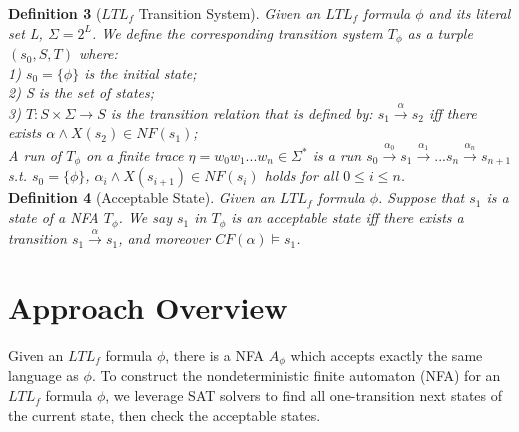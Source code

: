 {\bf Definition 3} ($LTL_f$ Transition System). {\it Given an $LTL_f$ formula $\phi$ and its literal set L, $\Sigma = 2^{L}$. We define the corresponding transition system $T_{\phi}$ as a turple $(s_0,S, T)$ where: \\
1) $s_0 = \{\phi\}$ is the initial state; \\
2) S is the set of states;\\
3) $T : S \times \Sigma \to S$ is the transition relation that is defined by: $s_1\overset{\alpha}{\rightarrow} s_2$ iff there exists $\alpha \wedge X(s_2) \in NF(s_1)$; \\
A run of $T_{\phi}$ on a finite trace $\eta = w_0w_1...w_n \in \Sigma^{*}$ is a run $s_0 \overset{\alpha_0}{\rightarrow} s_1 \overset{\alpha_1}{\rightarrow} ... s_n \overset{\alpha_n}{\rightarrow} s_{n+1} $ s.t. $s_0 = \{\phi\}$,  $\alpha_i \wedge X(s_{i+1}) \in NF(s_i)$ holds for all $0 \leq i \leq n$.
\\}
{\bf Definition 4} (Acceptable State). {\it Given an $LTL_f$ formula $\phi$. Suppose that $s_1$ is a state of a NFA $T_{\phi}$. We say  $s_1$ in $T_{\phi}$ is an acceptable state iff there exists a transition $ s_1 \overset{\alpha}{\rightarrow}s_1$, and moreover $CF(\alpha) \models s_1$. }   \\   
\section{Approach Overview}
Given an $LTL_f$ formula $\phi$, there is a NFA $A_{\phi}$ which accepts exactly the same language as $\phi$. To construct the nondeterministic finite automaton (NFA) for an $ LTL_f$ formula $\phi$, we leverage SAT solvers to find all one-transition next states of the current state, then check the acceptable states. 

